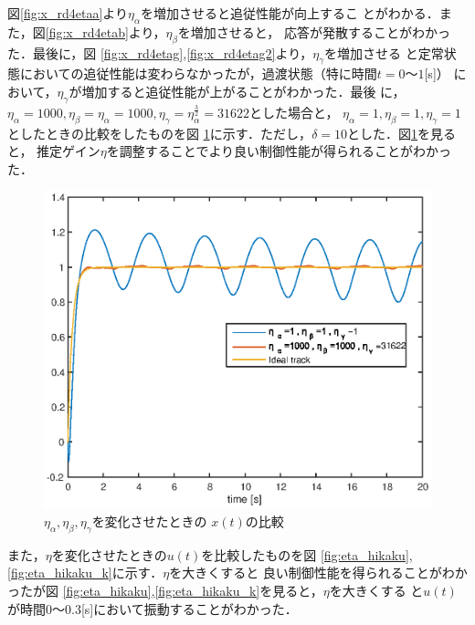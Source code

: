 \documentclass[a4paper,12pt]{jarticle}
\begin{document}
%
図\ref{fig:x_rd4etaa}より$\eta_\alpha$を増加させると追従性能が向上するこ
とがわかる．また，図\ref{fig:x_rd4etab}より，$\eta_\beta$を増加させると，
応答が発散することがわかった．最後に，図
\ref{fig:x_rd4etag},\ref{fig:x_rd4etag2}より，$\eta_\gamma$を増加させる
と定常状態においての追従性能は変わらなかったが，過渡状態（特に時間$t=0〜1$[s]）
において，$\eta_\gamma$が増加すると追従性能が上がることがわかった．最後
に，$\eta_\alpha=1000,\eta_\beta=\eta_\alpha=1000,\eta_\gamma=\eta^\frac{3}{2}_\alpha=31622$とした場合と，
$\eta_\alpha=1,\eta_\beta=1,\eta_\gamma=1$としたときの比較をしたものを図
\ref{fig:x_rd4_eta_reform}に示す．ただし，$\delta=10$とした．図\ref{fig:x_rd4_eta_reform}を見ると，
推定ゲイン$\eta$を調整することでより良い制御性能が得られることがわかった．
%
\begin{figure}[htb]
    \begin{center}
	 \includegraphics[width=140mm]{fig/x_rd4_eta_reform.eps}
	 \caption{$\eta_\alpha,\eta_\beta,\eta_\gamma$を変化させたときの
	 $x(t)$の比較}
        \label{fig:x_rd4_eta_reform}
    \end{center}
\end{figure}
%
また，$\eta$を変化させたときの$u(t)$を比較したものを図
\ref{fig:eta_hikaku},\ref{fig:eta_hikaku_k}に示す．$\eta$を大きくすると
良い制御性能を得られることがわかったが図
\ref{fig:eta_hikaku},\ref{fig:eta_hikaku_k}を見ると，$\eta$を大きくする
と$u(t)$が時間$0〜0.3$[s]において振動することがわかった．
%
\end{document}
